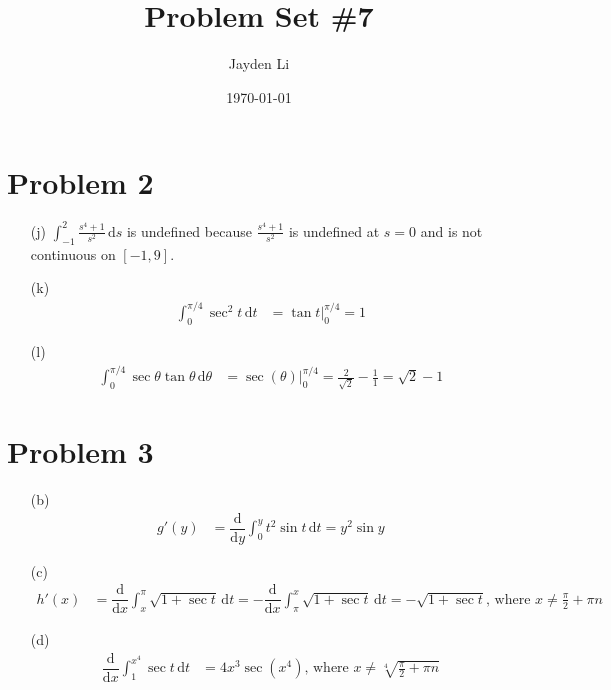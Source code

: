 \documentclass[preview, margin=0.6in]{standalone}
\title{\vspace*{-30pt}Problem Set \#7}
\author{Jayden Li}
\date{\today}
\newcommand*{\problem}[1]{\section*{Problem #1}}
\newcommand*{\deriv}[1][x]{\ensuremath{\dfrac{\mathrm{d}}{\mathrm{d}#1}}}
\begin{document}
\fontsize{12pt}{12pt}\selectfont
\setlength{\abovedisplayskip}{0pt}
\maketitle

\problem{2}
\begin{itemize}
	\item[(j)]	
		$\displaystyle\int_{-1}^{2}\frac{s^4+1}{s^2}\,\mathrm{d}s$ is undefined because $\frac{s^4+1}{s^2}$ is undefined at $s=0$ and is not continuous on $[-1,9]$. 
	\item[(k)]
		\begin{align*}
		    \int_{0}^{\pi/4}\sec^2 t\,\mathrm{d}t
			&=\left.\tan t\right|_{0}^{\pi/4}
			=1
		\end{align*}
	\item[(l)]
		\begin{align*}
		    \int_{0}^{\pi/4}\sec\theta\tan\theta\,\mathrm{d}\theta
			&=\left.\sec\left(\theta\right)\right|_{0}^{\pi/4}
			=\frac{2}{\sqrt{2}}-\frac{1}{1}
			=\sqrt{2}-1
		\end{align*}
\end{itemize}

\problem{3}
\begin{itemize}
	\item[(b)]
		\begin{align*}
			g'(y)
			&=\deriv[y]\int_{0}^{y}t^2\sin t\,\mathrm{d}t
			=y^2\sin y
		\end{align*}
	\item[(c)]
		\begin{align*}
		    h'(x)
			&=\deriv \int_{x}^{\pi}\sqrt{1+\sec t}\,\mathrm{d}t
			=-\deriv \int_{\pi}^{x}\sqrt{1+\sec t}\,\mathrm{d}t
			=-\sqrt{1+\sec t}
			\text{, where $\displaystyle x\neq \frac{\pi}{2}+\pi n$}
		\end{align*}
	\item[(d)]
		\begin{align*}
			\deriv[x]\int_{1}^{x^4}\sec t\,\mathrm{d}t
			&=4x^3\sec\left(x^4\right) \text{, where $x\neq\sqrt[4]{\frac{\pi}{2}+\pi n}$}
		\end{align*}
\end{itemize}
\end{document}

